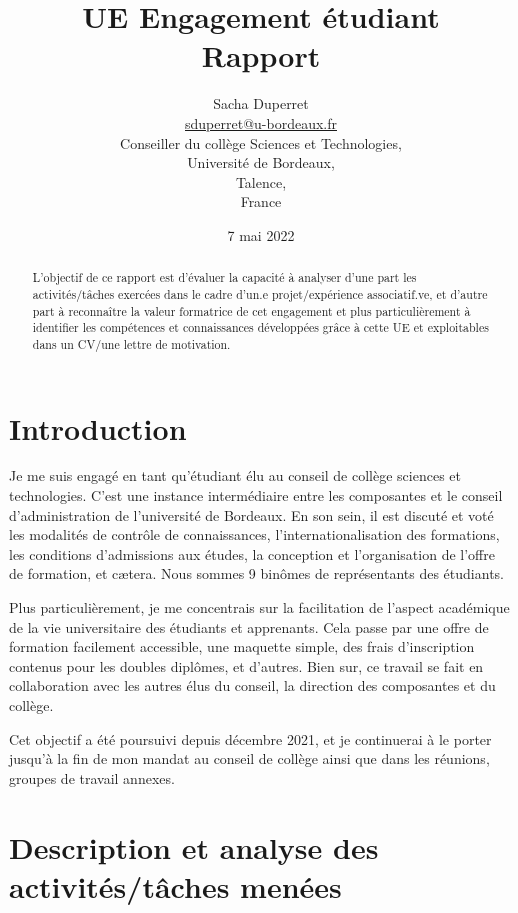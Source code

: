 \documentclass{article}
\title{{\huge UE Engagement étudiant\\Rapport}}
\author{$ $\\{\LARGE Sacha Duperret}\\ $ $\\ \href{mailto:sduperret@u-bordeaux.fr}{sduperret@u-bordeaux.fr}\\Conseiller du collège Sciences et Technologies,\\Université de Bordeaux,\\Talence,\\France}
\date{7 mai 2022}
\begin{document}
\maketitle

\vspace{20pt}

\tableofcontents

\vspace{50pt}

\begin{abstract}
L'objectif de ce rapport est d'évaluer la capacité à analyser d’une part les activités/tâches exercées dans le cadre d'un.e projet/expérience associatif.ve, et d’autre part à reconnaître la valeur formatrice de cet engagement et plus particulièrement à identifier les compétences et connaissances développées grâce à cette UE et exploitables dans un CV/une lettre de motivation.
\end{abstract}

\newpage \section*{Introduction}

Je me suis engagé en tant qu'étudiant élu au conseil de collège sciences et technologies. C'est une instance intermédiaire entre les composantes et le conseil d'administration de l'université de Bordeaux. En son sein, il est discuté et voté les modalités de contrôle de connaissances, l'internationalisation des formations, les conditions d'admissions aux études, la conception et l'organisation de l'offre de formation, et cætera. Nous sommes 9 binômes de représentants des étudiants.

Plus particulièrement, je me concentrais sur la facilitation de l'aspect académique de la vie universitaire des étudiants et apprenants. Cela passe par une offre de formation facilement accessible, une maquette simple, des frais d'inscription contenus pour les doubles diplômes, et d'autres. Bien sur, ce travail se fait en collaboration avec les autres élus du conseil, la direction des composantes et du collège.

Cet objectif a été poursuivi depuis décembre 2021, et je continuerai à le porter jusqu'à la fin de mon mandat au conseil de collège ainsi que dans les réunions, groupes de travail annexes.



\newpage \section{Description et analyse des activités/tâches menées}
\end{document}
